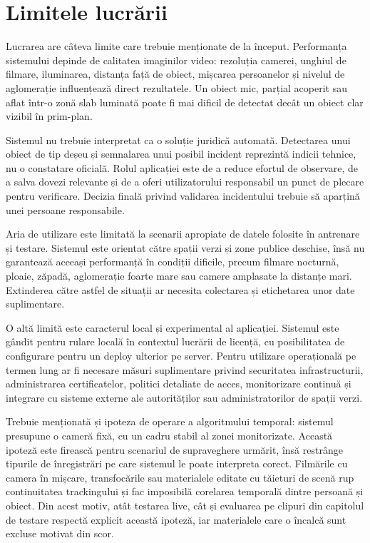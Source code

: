 \section*{Limitele lucrării}
{}

Lucrarea are câteva limite care trebuie menționate de la început. Performanța sistemului depinde de calitatea imaginilor video: rezoluția camerei, unghiul de filmare, iluminarea, distanța față de obiect, mișcarea persoanelor și nivelul de aglomerație influențează direct rezultatele. Un obiect mic, parțial acoperit sau aflat într-o zonă slab luminată poate fi mai dificil de detectat decât un obiect clar vizibil în prim-plan.

Sistemul nu trebuie interpretat ca o soluție juridică automată. Detectarea unui obiect de tip deșeu și semnalarea unui posibil incident reprezintă indicii tehnice, nu o constatare oficială. Rolul aplicației este de a reduce efortul de observare, de a salva dovezi relevante și de a oferi utilizatorului responsabil un punct de plecare pentru verificare. Decizia finală privind validarea incidentului trebuie să aparțină unei persoane responsabile.

Aria de utilizare este limitată la scenarii apropiate de datele folosite în antrenare și testare. Sistemul este orientat către spații verzi și zone publice deschise, însă nu garantează aceeași performanță în condiții dificile, precum filmare nocturnă, ploaie, zăpadă, aglomerație foarte mare sau camere amplasate la distanțe mari. Extinderea către astfel de situații ar necesita colectarea și etichetarea unor date suplimentare.

O altă limită este caracterul local și experimental al aplicației. Sistemul este gândit pentru rulare locală în contextul lucrării de licență, cu posibilitatea de configurare pentru un deploy ulterior pe server. Pentru utilizare operațională pe termen lung ar fi necesare măsuri suplimentare privind securitatea infrastructurii, administrarea certificatelor, politici detaliate de acces, monitorizare continuă și integrare cu sisteme externe ale autorităților sau administratorilor de spații verzi.

Trebuie menționată și ipoteza de operare a algoritmului temporal: sistemul presupune o cameră fixă, cu un cadru stabil al zonei monitorizate. Această ipoteză este firească pentru scenariul de supraveghere urmărit, însă restrânge tipurile de înregistrări pe care sistemul le poate interpreta corect. Filmările cu camera în mișcare, transfocările sau materialele editate cu tăieturi de scenă rup continuitatea trackingului și fac imposibilă corelarea temporală dintre persoană și obiect. Din acest motiv, atât testarea live, cât și evaluarea pe clipuri din capitolul de testare respectă explicit această ipoteză, iar materialele care o încalcă sunt excluse motivat din scor.

